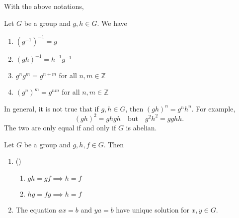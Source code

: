 \documentclass[notoc,notitlepage]{tufte-book}
\begin{document}
With the above notations,

\begin{propo}\label{propo:group_notations}
  Let $G$ be a group and $g, h \in G$. We have 
  \begin{enumerate}
    \item $(g^{-1})^{-1} = g$
    \item $(gh)^{-1} = h^{-1} g^{-1}$
    \item $g^n g^m = g^{n + m}$ for all $n, m \in \mathbb{Z}$
    \item $(g^n)^m = g^{nm}$ for all $n, m \in \mathbb{Z}$
  \end{enumerate}
\end{propo}

\begin{warning}
  In general, it is not true that if $g, h \in G$, then $(gh)^n = g^n h^n$. For example,
  \begin{equation*}
    (gh)^2 = ghgh \quad \text{but} \quad g^2 h^2 = gghh.
  \end{equation*}
  The two are only equal if and only if $G$ is abelian.
\end{warning}

\begin{propo}\label{propo:cancellation_laws}
  Let $G$ be a group and $g, h, f \in G$. Then
  \begin{enumerate}
    \item ()
      \begin{enumerate}
        \item $gh = gf \implies h = f$
        \item $hg = fg \implies h = f$
      \end{enumerate}
    \item The equation $ax = b$ and $ya = b$ have unique solution for $x, y \in G$.
  \end{enumerate}
\end{propo}




\nobibliography*


\printindex
\end{document}
